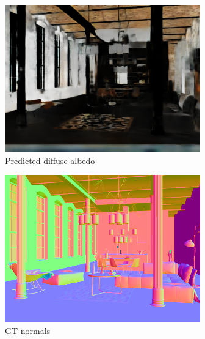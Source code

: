 \begin{figure}
\begin{subfigure}{0.32\linewidth}
    \includegraphics[width=\linewidth]{praca/images/AI46_009_Cam01.VRayLightSelect_RE_L0.albedo_output.png}
    \caption{Predicted diffuse albedo}
  \end{subfigure}
  \begin{subfigure}{0.32\linewidth}
    \includegraphics[width=\linewidth]{praca/images/AI46_009_Cam01.VRayLightSelect_RE_L0.normal.png}
    \caption{GT normals}
  \end{subfigure}
  \begin{subfigure}{0.32\linewidth}

\end{subfigure}
\end{figure}
